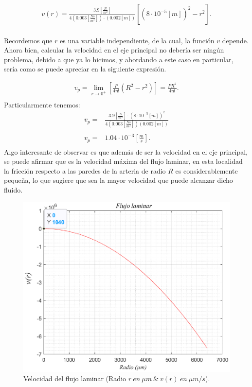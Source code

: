 \begin{align}
    v(r)=\frac{3.9\left[\frac{N}{m^2}\right]}{4\left(0.003\left[\frac{Ns}{m^2}\right]\right)\cdot\left(0.002\left[m\right]\right)}\left[\left(8\cdot10^{-5}\left[m\right]\right)^{2}-r^{2}\right]. \label{poiseUnits}
\end{align}
 \\
 Recordemos que $r$ es una variable independiente, de la cual, la función $v$ depende. Ahora bien, calcular la velocidad en el eje principal no debería ser ningún problema, debido a que ya lo hicimos, y abordando a este caso en particular, sería como se puede apreciar en la siguiente expresión.
 
  \begin{align*}
     v_{p}=\lim\limits_{r \to 0^+}\left[\frac{P}{4\eta l}\left(R^2-r^2\right)\right]=\frac{PR^2}{4\eta l}.\\
 \end{align*}
 Particularmente tenemos:
\begin{align*}
    v_{p}=&\frac{3.9\left[\frac{N}{m^2}\right]\cdot\left(8\cdot10^{-5}\left[m\right]\right)^2}{4\left(0.003\left[\frac{Ns}{m^2}\right]\right) 
    \left(0.002\left[m\right]\right)}\\ \\
    v_{p}=&1.04\cdot10^{-3}\left[\frac{m}{s}\right].\\
 \end{align*}
 Algo interesante de observar es que además de ser la velocidad en el eje principal, se puede afirmar que es la velocidad máxima del flujo laminar, en esta localidad la fricción respecto a las paredes de la arteria de radio $R$ es considerablemente pequeña, lo que sugiere que sea la mayor velocidad que puede alcanzar dicho fluido.
 \begin{figure}[H]
    \centering
    \includegraphics[scale=0.70]{capitulos/graficas/pps.eps}\caption{Velocidad del flujo laminar (Radio $r \ en \ \mu m\ \& \ v(r) \ en\ \mu m/s$).}
    \label{fig:graphic_poise}
\end{figure}
